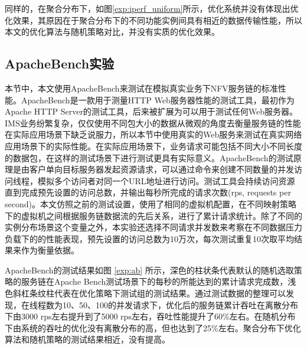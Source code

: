 同样的，在聚合分布下，如图\ref{exp:iperf_uniform}所示，优化系统并没有体现出优化效果，其原因在于聚合分布下的不同功能实例间具有相近的数据传输性能，所以本文的优化算法与随机策略对比，并没有实质的优化效果。

\newpage
\subsection{ApacheBench实验}
本节中，本文使用ApacheBench来测试在模拟真实业务下NFV服务链的标准性能。ApacheBench是一款用于测量HTTP Web服务器性能的测试工具，最初作为Apache HTTP Server的测试工具，后来被扩展为可以用于测试任何Web服务器。IMS业务纷繁复杂，仅仅使用不同包大小的数据从微观的角度去衡量服务链的性能在实际应用场景下缺乏说服力，所以本节中使用真实的Web服务来测试在真实网络应用场景下的实际性能。在实际应用场景下，业务请求可能包括不同大小不同长度的数据包，在这样的测试场景下进行测试更具有实际意义。ApacheBench的测试原理是由客户单向目标服务器发起资源请求，可以通过命令来创建不同数量的并发访问线程，模拟多个访问者对同一个URL地址进行访问。测试工具会持续访问资源直到完成预先设置的访问总数，并输出每秒所完成的请求次数(rps, requests per second)。本文仿照之前的测试设置，使用了相同的虚拟机配置，在不同映射策略下的虚拟机之间根据服务链数据流的先后关系，进行了累计请求统计。除了不同的实例分布场景这个变量之外，本实验还选择不同请求并发数来考察在不同数据压力负载下的的性能表现，预先设置的访问总数为10万次，每次测试重复10次取平均结果来作为衡量依据。
\begin{figure}[!htp]
	\centering
\end{figure}
\begin{figure}
\addtocounter{subfigure}{1}
\ContinuedFloat
\centering
\end{figure}

ApacheBench的测试结果如图 \ref{exp:ab} 所示，深色的柱状条代表默认的随机选取策略的服务链在Apache Bench测试场景下的每秒的所能达到的累计请求完成数，浅色斜杠条纹柱代表在优化策略下测试组的测试结果。通过测试数据的整理可以发现，在线程数为10、50、100的并发请求下，优化后的服务链累计吞吐在离散分布下由3000 rps左右提升到了5000 rps左右，吞吐性能提升了60\%左右。在随机分布下由系统的吞吐的优化没有离散分布的高，但也达到了25\%左右。聚合分布下优化算法和随机策略的测试结果相近，没有提高。

